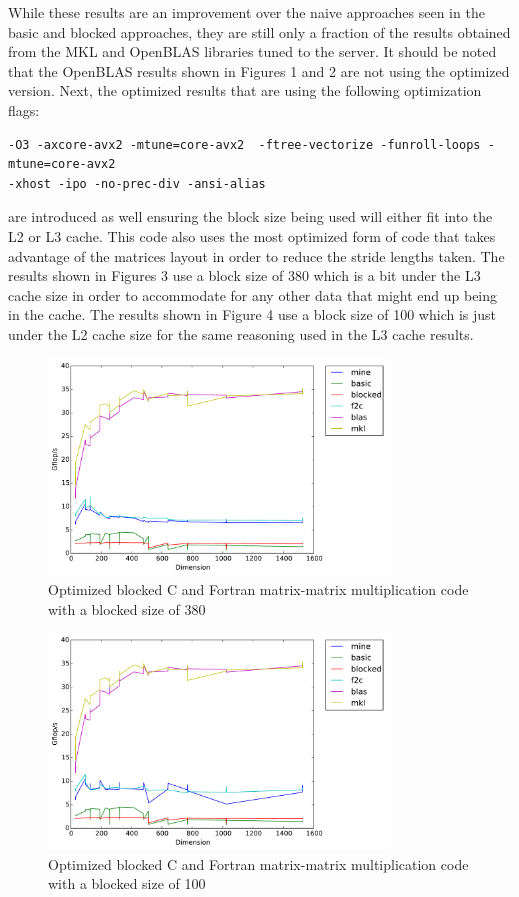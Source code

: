 \documentclass{article}
\begin{document}
\noindent While these results are an improvement over the naive approaches seen in the basic and blocked approaches, they are still only a fraction of the results obtained from the MKL and OpenBLAS libraries tuned to the server. It should be noted that the OpenBLAS results shown in Figures 1 and 2 are not using the optimized version.  Next, the optimized results that are using the following optimization flags:
\begin{verbatim}
-O3 -axcore-avx2 -mtune=core-avx2  -ftree-vectorize -funroll-loops -mtune=core-avx2
-xhost -ipo -no-prec-div -ansi-alias
\end{verbatim}
\noindent are introduced as well ensuring the block size being used will either fit into the L2 or L3 cache. This code also uses the most optimized form of code that takes advantage of the matrices layout in order to reduce the stride lengths taken. The results shown in Figures 3 use a block size of 380 which is a bit under the L3 cache size in order to accommodate for any other data that might end up being in the cache. The results shown in Figure 4 use a block size of 100 which is just under the L2 cache size for the same reasoning used in the L3 cache results. 

\begin{figure}[H]
  \centering
    \includegraphics[width=0.8\textwidth]{c_f_blocked_opt_flags_b380}
    \caption{Optimized blocked C and Fortran matrix-matrix multiplication code with a blocked size of 380}
\end{figure}

\begin{figure}[H]
  \centering
    \includegraphics[width=0.8\textwidth]{c_f_blocked_opt_flags_b100}
    \caption{Optimized blocked C and Fortran matrix-matrix multiplication code with a blocked size of 100}
\end{figure}
\end{document}
